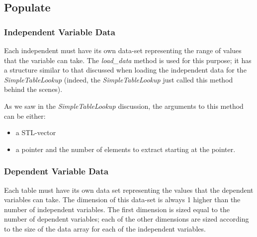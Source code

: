 \documentclass[11pt,fleqn]{report}
\begin{document}

\subsection{Populate}
\subsubsection{Independent Variable Data}
Each independent must have its own data-set representing the range of values
 that the
variable can take.  The \textit{load\_data} method is used for this purpose;
 it has a structure similar to that discussed when loading the independent
 data for the \textit{SimpleTableLookup} (indeed, the
 \textit{SimpleTableLookup} just called this method behind the
 scenes).

As we saw in the \textit{SimpleTableLookup} discussion, the arguments to
 this method can be either:
\begin{itemize}
 \item a STL-vector
 \item a pointer and the number of elements to extract starting at the pointer.
\end{itemize}


\subsubsection{Dependent Variable Data}
Each table must have its own data set representing the values that the
 dependent variables can take.
The dimension of this data-set is always 1 higher than the number of
 independent variables.  The first dimension is sized equal to the number
 of dependent variables; each of the other dimensions are sized
 according to the size of the data array for each of the independent
 variables.
\end{document}
